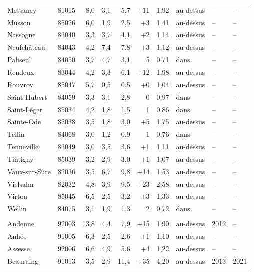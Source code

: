 \begin{longtable}{lrrrrrrlll}
Messancy & 81015 & 8{,}0 & 3{,}1 & 5{,}7 & +11 & 1{,}92 & au-dessus & -- & -- \\
Musson & 85026 & 6{,}0 & 1{,}9 & 2{,}5 & +3 & 1{,}41 & au-dessus & -- & -- \\
Nassogne & 83040 & 3{,}3 & 3{,}7 & 4{,}1 & +2 & 1{,}14 & au-dessus & -- & -- \\
Neufchâteau & 84043 & 4{,}2 & 7{,}4 & 7{,}8 & +3 & 1{,}12 & au-dessus & -- & -- \\
Paliseul & 84050 & 3{,}7 & 4{,}7 & 3{,}1 & \textminus{}5 & 0{,}71 & dans & -- & -- \\
Rendeux & 83044 & 4{,}2 & 3{,}3 & 6{,}1 & +12 & 1{,}98 & au-dessus & -- & -- \\
Rouvroy & 85047 & 5{,}7 & 0{,}5 & 0{,}5 & +0 & 1{,}04 & au-dessus & -- & -- \\
Saint-Hubert & 84059 & 3{,}3 & 3{,}1 & 2{,}8 & \textminus{}0 & 0{,}97 & dans & -- & -- \\
Saint-Léger & 85034 & 4{,}2 & 1{,}8 & 1{,}5 & \textminus{}1 & 0{,}86 & dans & -- & -- \\
Sainte-Ode & 82038 & 3{,}5 & 1{,}8 & 3{,}0 & +5 & 1{,}75 & au-dessus & -- & -- \\
Tellin & 84068 & 3{,}0 & 1{,}2 & 0{,}9 & \textminus{}1 & 0{,}76 & dans & -- & -- \\
Tenneville & 83049 & 3{,}0 & 3{,}5 & 3{,}6 & +1 & 1{,}11 & au-dessus & -- & -- \\
Tintigny & 85039 & 3{,}2 & 2{,}9 & 3{,}0 & +1 & 1{,}07 & au-dessus & -- & -- \\
Vaux-sur-Sûre & 82036 & 3{,}5 & 6{,}7 & 9{,}8 & +14 & 1{,}53 & au-dessus & -- & -- \\
Vielsalm & 82032 & 4{,}8 & 3{,}9 & 9{,}5 & +23 & 2{,}58 & au-dessus & -- & -- \\
Virton & 85045 & 6{,}5 & 2{,}5 & 3{,}2 & +3 & 1{,}33 & au-dessus & -- & -- \\
Wellin & 84075 & 3{,}1 & 1{,}9 & 1{,}3 & \textminus{}2 & 0{,}72 & dans & -- & -- \\
\addlinespace
\multicolumn{10}{l}{\textbf{Namur} (38 communes)} \\
Andenne & 92003 & 13{,}8 & 4{,}4 & 7{,}9 & +15 & 1{,}90 & au-dessus & 2012 & -- \\
Anhée & 91005 & 6{,}3 & 2{,}5 & 2{,}6 & +1 & 1{,}10 & au-dessus & -- & -- \\
Assesse & 92006 & 6{,}6 & 4{,}9 & 5{,}6 & +4 & 1{,}22 & au-dessus & -- & -- \\
Beauraing & 91013 & 3{,}5 & 2{,}9 & 11{,}4 & +35 & 4{,}20 & au-dessus & 2013 & 2021 \\

\end{longtable}
